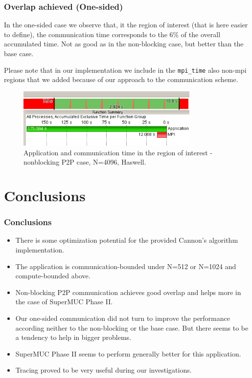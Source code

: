 \documentclass[10pt, compress]{beamer}
\begin{document}
\begin{frame}
  \frametitle{Overlap achieved (One-sided)}
  In the one-sided case we observe that, it the region of interest (that is here easier to define), the communication time corresponds to the 6\% of the overall accumulated time. Not as good as in the non-blocking case, but better than the base case. 
  
  Please note that in our implementation we include in the \texttt{mpi\_time} also non-mpi regions that we added because of our approach to the communication scheme. 
  \begin{figure}
  \centering
  \includegraphics[width=0.8\textwidth]{images/overlap_onesided.png}
  \caption{Application and communication time in the region of interest - nonblocking P2P case, N=4096, Haswell.}
  \label{fig:overlap_onesided}
  \end{figure}
\end{frame}

\section{Conclusions}
\begin{frame}
  \frametitle{Conclusions}
  \begin{itemize}
      \item There is some optimization potential for the provided Cannon's algorithm implementation.
      \item The application is communication-bounded under N=512 or N=1024 and compute-bounded above.
      \item Non-blocking P2P communication achieves good overlap and helps more in the case of SuperMUC Phase II.
      \item Our one-sided communication did not turn to improve the performance according neither to the non-blocking or the base case. But there seems to be a tendency to help in bigger problems.
      \item SuperMUC Phase II seems to perform generally better for this application.
      \item Tracing proved to be very useful during our investigations.
  \end{itemize}
\end{frame}
\end{document}
